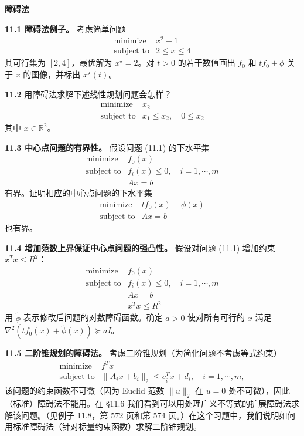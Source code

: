 \documentclass[UTF8, 12pt, fontset=fandol, oneside]{ctexart}
\begin{document}
\noindent\textbf{障碍法}

\noindent\textbf{11.1 障碍法例子。} 考虑简单问题
\[
\begin{array}{ll}
\text{minimize} & x^2+1\\
\text{subject to} & 2\leq x\leq 4
\end{array}
\]
其可行集为 $[2,4]$，最优解为 $x^\star=2$。对 $t>0$ 的若干数值画出 $f_0$ 和 $tf_0+\phi$ 关于 $x$ 的图像，并标出 $x^\star(t)$。

\noindent\textbf{11.2} 用障碍法求解下述线性规划问题会怎样？
\[
\begin{array}{ll}
\text{minimize} & x_2\\
\text{subject to} & x_1\leq x_2,\quad 0\leq x_2
\end{array}
\]
其中 $x\in\mathbb{R}^2$。

\noindent\textbf{11.3 中心点问题的有界性。} 假设问题 (11.1) 的下水平集
\[
\begin{array}{ll}
\text{minimize} & f_0(x)\\
\text{subject to} & f_i(x)\leq 0,\quad i=1,\cdots,m\\
& Ax=b
\end{array}
\]
有界。证明相应的中心点问题的下水平集
\[
\begin{array}{ll}
\text{minimize} & tf_0(x)+\phi(x)\\
\text{subject to} & Ax=b
\end{array}
\]
也有界。

\noindent\textbf{11.4 增加范数上界保证中心点问题的强凸性。} 假设对问题 (11.1) 增加约束 $x^Tx\leq R^2$：
\[
\begin{array}{ll}
\text{minimize} & f_0(x)\\
\text{subject to} & f_i(x)\leq 0,\quad i=1,\cdots,m\\
& Ax=b\\
& x^Tx\leq R^2
\end{array}
\]
用 $\tilde{\phi}$ 表示修改后问题的对数障碍函数。确定 $a>0$ 使对所有可行的 $x$ 满足 $\nabla^2(tf_0(x)+\tilde{\phi}(x))\succeq aI$。

\noindent\textbf{11.5 二阶锥规划的障碍法。} 考虑二阶锥规划（为简化问题不考虑等式约束）
\begin{equation}
\begin{array}{ll}
\text{minimize} & f^Tx\\
\text{subject to} & \|A_ix+b_i\|_2\leq c_i^Tx+d_i,\quad i=1,\cdots,m,
\end{array}
\tag{11.63}
\end{equation}
该问题的约束函数不可微（因为 Euclid 范数 $\|u\|_2$ 在 $u=0$ 处不可微），因此（标准）障碍法不能用。在 \S11.6 我们看到可以用处理广义不等式的扩展障碍法求解该问题。（见例子 11.8，第 572 页和第 574 页。）在这个习题中，我们说明如何用标准障碍法（针对标量约束函数）求解二阶锥规划。
\end{document}
